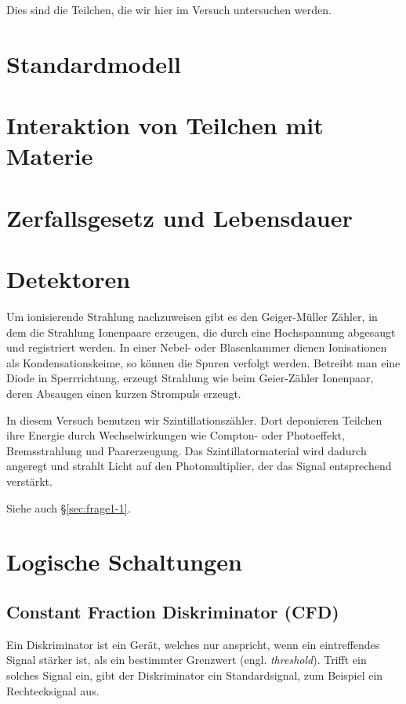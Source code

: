 \documentclass[11pt, ngerman, fleqn, DIV=15, headinclude, BCOR=2cm]{scrreprt}
\begin{document}
Dies sind die Teilchen, die wir hier im Versuch untersuchen werden.

\section{Standardmodell}

\section{Interaktion von Teilchen mit Materie}

\section{Zerfallsgesetz und Lebensdauer}

\section{Detektoren}

Um ionisierende Strahlung nachzuweisen gibt es den Geiger-Müller Zähler, in dem
die Strahlung Ionenpaare erzeugen, die durch eine Hochspannung abgesaugt und
registriert werden. In einer Nebel- oder Blasenkammer dienen Ionisationen als
Kondensationskeime, so können die Spuren verfolgt werden. Betreibt man eine
Diode in Sperrrichtung, erzeugt Strahlung wie beim Geier-Zähler Ionenpaar,
deren Absaugen einen kurzen Strompuls erzeugt.

In diesem Versuch benutzen wir Szintillationszähler. Dort deponieren Teilchen
ihre Energie durch Wechselwirkungen wie Compton- oder Photoeffekt,
Bremsstrahlung und Paarerzeugung. Das Szintillatormaterial wird dadurch
angeregt und strahlt Licht auf den Photomultiplier, der das Signal entsprechend
verstärkt.

Siehe auch §\ref{sec:frage1-1}.

\section{Logische Schaltungen}

\subsection{Constant Fraction Diskriminator (CFD)}

Ein Diskriminator ist ein Gerät, welches nur anspricht, wenn ein eintreffendes
Signal stärker ist, als ein bestimmter Grenzwert (engl. \emph{threshold}).
Trifft ein solches Signal ein, gibt der Diskriminator ein Standardsignal, zum
Beispiel ein Rechtecksignal aus.
\end{document}
